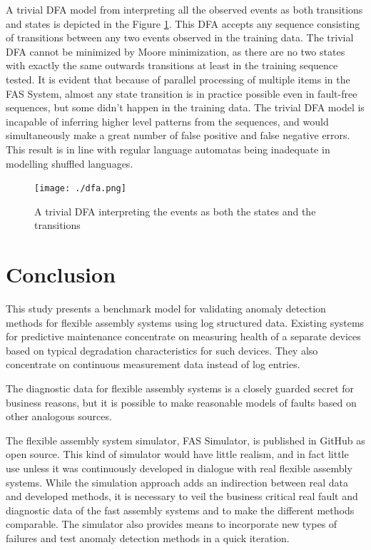 \documentclass[journal]{IEEEtran}
\begin{document}
A trivial DFA model from interpreting all the observed events as both transitions and states is depicted in the Figure \ref{figure:trivial_DFA}.
This DFA accepts any sequence consisting of transitions between any two events observed in the training data. The trivial DFA cannot be minimized by Moore minimization,
as there are no two states with exactly the same outwards transitions at least in the training sequence tested.
It is evident that because of parallel processing of multiple items in the FAS System, almost any state transition is
in practice possible even in fault-free sequences, but some didn't happen in the training data.
The trivial DFA model is incapable of inferring higher level patterns from the sequences, and would simultaneously make a great number of false positive
and false negative errors. This result is in line with regular language automatas being inadequate in modelling shuffled languages.
\begin{figure}[tb]
 \centering
 \texttt{[image: ./dfa.png]}
 \caption{A trivial DFA interpreting the events as both the states and the transitions}
 \label{figure:trivial_DFA}
\end{figure}

\section{Conclusion}

This study presents a benchmark model for validating anomaly detection methods for flexible assembly systems using log structured data.
Existing systems for predictive maintenance concentrate on measuring health of a separate devices based on typical degradation characteristics
for such devices. They also concentrate on continuous measurement data instead of log entries.

The diagnostic data for flexible assembly systems is a closely guarded secret for business reasons, but it is possible to make reasonable models
of faults based on other analogous sources.

The flexible assembly system simulator, FAS Simulator, is published in GitHub \cite{FASSimulator} as open source. This kind of simulator would have
little realism, and in fact little use unless it was continuously developed in dialogue with real flexible assembly systems. While the simulation
approach adds an indirection between real data and developed methods, it is necessary to veil the business critical real fault and diagnostic
data of the fast assembly systems and to make the different methods comparable. The simulator also provides means to incorporate new types of
failures and test anomaly detection methods in a quick iteration.
\end{document}
